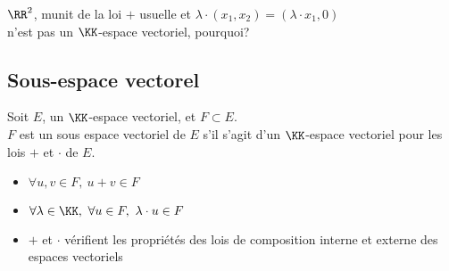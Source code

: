 \documentclass[../main.tex]{subfile}
\begin{document}
\begin{rema}
	$\RR^2$, munit de la loi $+$ usuelle et $\lambda \cdot (x_1, x_2) = (\lambda \cdot x_1, 0)$\\
	n'est pas un $\KK$-espace vectoriel, pourquoi?
\end{rema}

\subsection{Sous-espace vectorel}

\begin{defi}
	Soit $E$, un $\KK$-espace vectoriel, et $F \subset E$.\\
	$F$ est un sous espace vectoriel de $E$ s'il s'agit d'un $\KK$-espace vectoriel pour les lois $+$ et $\cdot$ de $E$.
\begin{itemize}
	\item $\forall u, v \in F, \ u + v \in F$
	\item $\forall \lambda \in \KK, \ \forall u \in F, \ \lambda \cdot u \in F$
	\item $+$ et $\cdot$ vérifient les propriétés des lois de composition interne et externe des espaces vectoriels
\end{itemize}
\end{defi}
\end{document}

